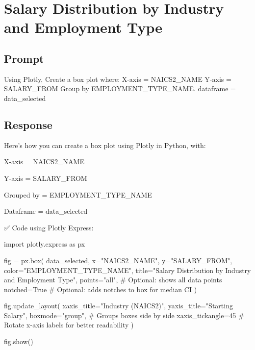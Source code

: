 \documentclass[
  letterpaper,
  DIV=11,
  numbers=noendperiod]{scrartcl}
\newenvironment{Shaded}{\begin{snugshade}}{\end{snugshade}}
\newcommand{\CommentTok}[1]{\textcolor[rgb]{0.37,0.37,0.37}{#1}}
\newcommand{\DecValTok}[1]{\textcolor[rgb]{0.68,0.00,0.00}{#1}}
\newcommand{\ImportTok}[1]{\textcolor[rgb]{0.00,0.46,0.62}{#1}}
\newcommand{\NormalTok}[1]{\textcolor[rgb]{0.00,0.23,0.31}{#1}}
\newcommand{\OperatorTok}[1]{\textcolor[rgb]{0.37,0.37,0.37}{#1}}
\newcommand{\StringTok}[1]{\textcolor[rgb]{0.13,0.47,0.30}{#1}}
\newcommand{\VariableTok}[1]{\textcolor[rgb]{0.07,0.07,0.07}{#1}}
\begin{document}
\section{Salary Distribution by Industry and Employment
Type}\label{salary-distribution-by-industry-and-employment-type}

\subsection{Prompt}\label{prompt-1}

Using Plotly, Create a box plot where: X-axis = NAICS2\_NAME Y-axis =
SALARY\_FROM Group by EMPLOYMENT\_TYPE\_NAME. dataframe = data\_selected

\subsection{Response}\label{response-1}

Here's how you can create a box plot using Plotly in Python, with:

X-axis = NAICS2\_NAME

Y-axis = SALARY\_FROM

Grouped by = EMPLOYMENT\_TYPE\_NAME

Dataframe = data\_selected

✅ Code using Plotly Express:

\begin{Shaded}
\begin{Highlighting}[]
\ImportTok{import}\NormalTok{ plotly.express }\ImportTok{as}\NormalTok{ px}

\NormalTok{fig }\OperatorTok{=}\NormalTok{ px.box(}
\NormalTok{    data\_selected,}
\NormalTok{    x}\OperatorTok{=}\StringTok{"NAICS2\_NAME"}\NormalTok{,}
\NormalTok{    y}\OperatorTok{=}\StringTok{"SALARY\_FROM"}\NormalTok{,}
\NormalTok{    color}\OperatorTok{=}\StringTok{"EMPLOYMENT\_TYPE\_NAME"}\NormalTok{,}
\NormalTok{    title}\OperatorTok{=}\StringTok{"Salary Distribution by Industry and Employment Type"}\NormalTok{,}
\NormalTok{    points}\OperatorTok{=}\StringTok{"all"}\NormalTok{,  }\CommentTok{\# Optional: shows all data points}
\NormalTok{    notched}\OperatorTok{=}\VariableTok{True}   \CommentTok{\# Optional: adds notches to box for median CI}
\NormalTok{)}

\NormalTok{fig.update\_layout(}
\NormalTok{    xaxis\_title}\OperatorTok{=}\StringTok{"Industry (NAICS2)"}\NormalTok{,}
\NormalTok{    yaxis\_title}\OperatorTok{=}\StringTok{"Starting Salary"}\NormalTok{,}
\NormalTok{    boxmode}\OperatorTok{=}\StringTok{"group"}\NormalTok{,  }\CommentTok{\# Groups boxes side by side}
\NormalTok{    xaxis\_tickangle}\OperatorTok{=}\DecValTok{45}  \CommentTok{\# Rotate x{-}axis labels for better readability}
\NormalTok{)}

\NormalTok{fig.show()}
\end{Highlighting}
\end{Shaded}
\end{document}
